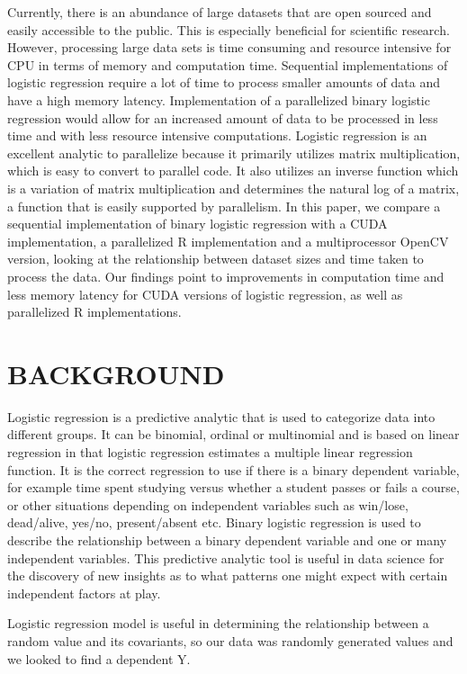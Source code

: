 \documentclass[letterpaper, 10 pt, conference]{ieeeconf}  %
\begin{document}
Currently, there is an abundance of large datasets that are open sourced and easily accessible to the public. This is especially beneficial for scientific research. However, processing large data sets is time consuming and resource intensive for CPU in terms of memory and computation time. Sequential implementations of logistic regression require a lot of time to process smaller amounts of data and have a high memory latency. Implementation of a parallelized binary logistic regression would allow for an increased amount of data to be processed in less time and with less resource intensive computations. Logistic regression is an excellent analytic to parallelize because it primarily utilizes matrix multiplication, which is easy to convert to parallel code. It also utilizes an inverse function which is a variation of matrix multiplication and determines the natural log of a matrix, a function that is easily supported by parallelism. In this paper, we compare a sequential implementation of binary logistic regression with a CUDA implementation, a parallelized R implementation and a multiprocessor OpenCV version, looking at the relationship between dataset sizes and time taken to process the data. Our findings point to improvements in computation time and less memory latency for CUDA versions of logistic regression, as well as parallelized R implementations.


\section{BACKGROUND}

Logistic regression is a predictive analytic that is used to categorize data into different groups. It can be binomial, ordinal or multinomial and is based on linear regression in that logistic regression estimates a multiple linear regression function. It is the correct regression to use if there is a binary dependent variable, for example time spent studying versus whether a student passes or fails a course, or other situations depending on independent variables such as win/lose, dead/alive, yes/no, present/absent etc. Binary logistic regression is used to describe the relationship between a binary dependent variable and one or many independent variables. This predictive analytic tool is useful in data science for the discovery of new insights as to what patterns one might expect with certain independent factors at play. 

Logistic regression model is useful in determining the relationship between a random value and its covariants, so our data was randomly generated values and we looked to find a dependent Y.
\end{document}
